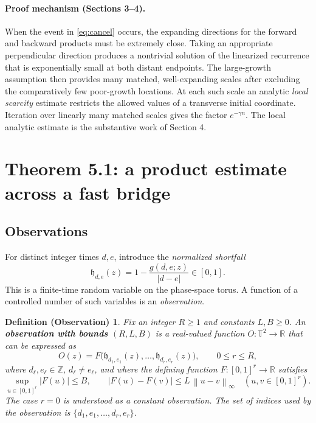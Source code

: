 \documentclass[11pt,a4paper]{article}
\newtheorem*{observationdef}{Definition (Observation)}
\newcommand{\R}{\mathbb{R}}
\newcommand{\T}{\mathbb{T}}
\newcommand{\Z}{\mathbb{Z}}
\newcommand{\norm}[1]{\left\lVert #1\right\rVert}
\begin{document}
\paragraph{Proof mechanism (Sections 3--4).} When the event in \eqref{eq:cancel} occurs, the expanding directions for the forward and backward products must be extremely close. Taking an appropriate perpendicular direction produces a nontrivial solution of the linearized recurrence that is exponentially small at both distant endpoints. The large-growth assumption then provides many matched, well-expanding scales after excluding the comparatively few poor-growth locations. At each such scale an analytic \emph{local scarcity} estimate restricts the allowed values of a transverse initial coordinate. Iteration over linearly many matched scales gives the factor $e^{-\gamma n}$. The local analytic estimate is the substantive work of Section 4.

\section{Theorem 5.1: a product estimate across a fast bridge}

\subsection*{Observations}
For distinct integer times $d,e$, introduce the \emph{normalized shortfall}
\begin{equation}\label{eq:obssh}
 \mathfrak h_{d,e}(z)=1-\frac{g(d,e;z)}{|d-e|}\in[0,1].
\end{equation}
This is a finite-time random variable on the phase-space torus. A function
of a controlled number of such variables is an \emph{observation}.

\begin{observationdef}
Fix an integer $R\ge1$ and constants $L,B\ge0$. An
\textbf{observation with bounds $(R,L,B)$} is a real-valued function
$O:\T^2\to\R$ that can be expressed as
\begin{equation}\label{eq:observation-def}
 O(z)=F\bigl(\mathfrak h_{d_1,e_1}(z),\ldots,
             \mathfrak h_{d_r,e_r}(z)\bigr),\qquad 0\le r\le R,
\end{equation}
where $d_\ell,e_\ell\in\Z$, $d_\ell\ne e_\ell$, and where the defining
function $F:[0,1]^r\to\R$ satisfies
\begin{equation}\label{eq:observation-bounds}
 \sup_{u\in[0,1]^r}|F(u)|\le B,
 \qquad
 |F(u)-F(v)|\le L\,\norm{u-v}_\infty
 \quad (u,v\in[0,1]^r).
\end{equation}
The case $r=0$ is understood as a constant observation.
The set of \emph{indices used by the observation} is
$\{d_1,e_1,\ldots,d_r,e_r\}$.
\end{observationdef}
\end{document}
